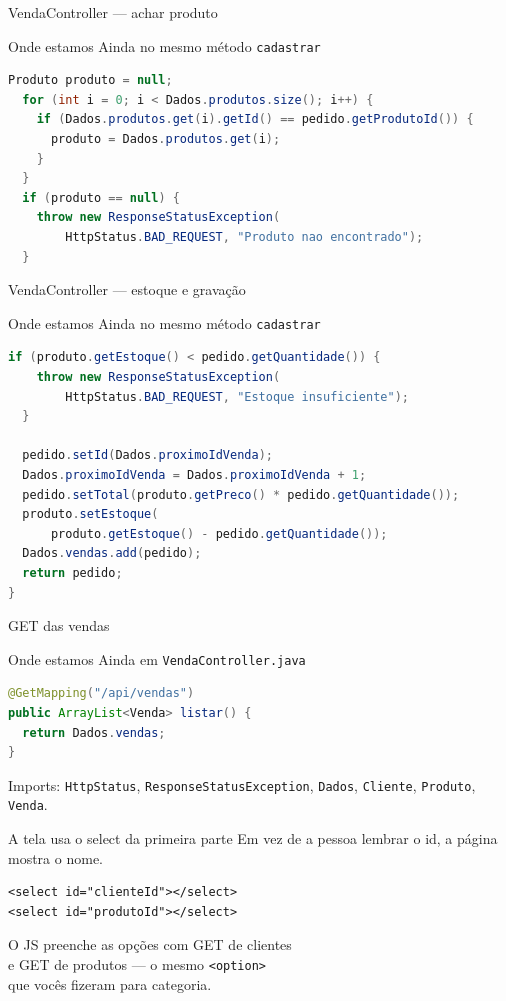 \documentclass[aspectratio=169,11pt]{beamer}
\newcommand{\onde}[1]{%
  \begin{block}{Onde estamos}
    #1
  \end{block}
}
\begin{document}
\begin{frame}[fragile]{VendaController --- achar produto}
  \onde{Ainda no mesmo método \texttt{cadastrar}}

\begin{lstlisting}[language=Java,basicstyle=\ttfamily\scriptsize]
  Produto produto = null;
  for (int i = 0; i < Dados.produtos.size(); i++) {
    if (Dados.produtos.get(i).getId() == pedido.getProdutoId()) {
      produto = Dados.produtos.get(i);
    }
  }
  if (produto == null) {
    throw new ResponseStatusException(
        HttpStatus.BAD_REQUEST, "Produto nao encontrado");
  }
\end{lstlisting}
\end{frame}

\begin{frame}[fragile]{VendaController --- estoque e gravação}
  \onde{Ainda no mesmo método \texttt{cadastrar}}

\begin{lstlisting}[language=Java,basicstyle=\ttfamily\scriptsize]
  if (produto.getEstoque() < pedido.getQuantidade()) {
    throw new ResponseStatusException(
        HttpStatus.BAD_REQUEST, "Estoque insuficiente");
  }

  pedido.setId(Dados.proximoIdVenda);
  Dados.proximoIdVenda = Dados.proximoIdVenda + 1;
  pedido.setTotal(produto.getPreco() * pedido.getQuantidade());
  produto.setEstoque(
      produto.getEstoque() - pedido.getQuantidade());
  Dados.vendas.add(pedido);
  return pedido;
}
\end{lstlisting}
\end{frame}

\begin{frame}[fragile]{GET das vendas}
  \onde{Ainda em \texttt{VendaController.java}}

\begin{lstlisting}[language=Java,basicstyle=\ttfamily\footnotesize]
@GetMapping("/api/vendas")
public ArrayList<Venda> listar() {
  return Dados.vendas;
}
\end{lstlisting}

  \vspace{0.4em}
  Imports: \texttt{HttpStatus}, \texttt{ResponseStatusException},
  \texttt{Dados}, \texttt{Cliente}, \texttt{Produto}, \texttt{Venda}.
\end{frame}

\begin{frame}[fragile]{A tela usa o select da primeira parte}
  Em vez de a pessoa lembrar o id, a página mostra o nome.

\begin{lstlisting}[basicstyle=\ttfamily\footnotesize]
<select id="clienteId"></select>
<select id="produtoId"></select>
\end{lstlisting}

  \vspace{0.4em}
  O JS preenche as opções com GET de clientes\\
  e GET de produtos --- o mesmo \texttt{<option>}\\
  que vocês fizeram para categoria.
\end{frame}
\end{document}

